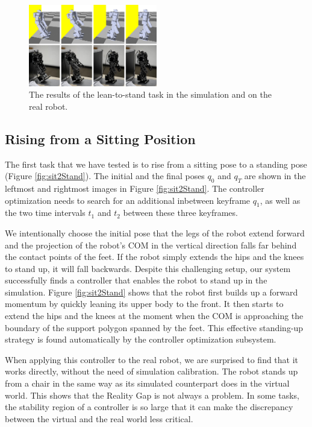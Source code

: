 \begin{figure}[!t]
  \centering
  \includegraphics[width=0.5\textwidth]{figures/lean2Stand}
  \caption{The results of the lean-to-stand task in the simulation and on the real robot.}
  \label{fig:lean2Stand}
\end{figure}

\subsection{Rising from a Sitting Position}

The first task that we have tested is to rise from a sitting pose to a standing pose (Figure \ref{fig:sit2Stand}). The initial and the final poses $q_0$ and $q_T$ are shown in the leftmost and rightmost images in Figure \ref{fig:sit2Stand}. The controller optimization needs to search for an additional inbetween keyframe $q_1$, as well as the two time intervals $t_1$ and $t_2$ between these three keyframes. 

We intentionally choose the initial pose that the legs of the robot extend forward and the projection of the robot's COM in the vertical direction falls far behind the contact points of the feet. If the robot simply extends the hips and the knees to stand up, it will fall backwards. Despite this challenging setup, our system successfully finds a controller that enables the robot to stand up in the simulation. Figure \ref{fig:sit2Stand} shows that the robot first builds up a forward momentum by quickly leaning its upper body to the front. It then starts to extend the hips and the knees at the moment when the COM is approaching the boundary of the support polygon spanned by the feet. This effective standing-up strategy is found automatically by the controller optimization subsystem.

When applying this controller to the real robot, we are surprised to find that it works directly, without the need of simulation calibration. The robot stands up from a chair in the same way as its simulated counterpart does in the virtual world. This shows that the Reality Gap is not always a problem. In some tasks, the stability region of a controller is so large that it can make the discrepancy between the virtual and the real world less critical.


